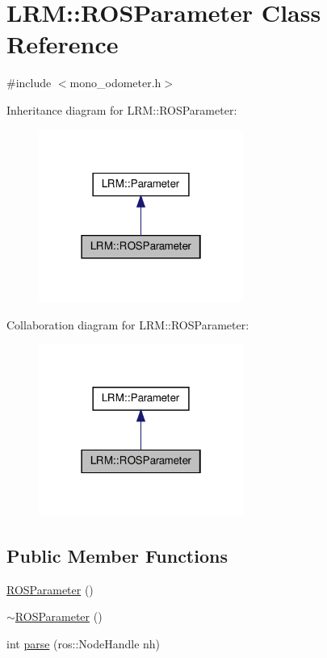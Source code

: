 \hypertarget{classLRM_1_1ROSParameter}{\section{\-L\-R\-M\-:\-:\-R\-O\-S\-Parameter \-Class \-Reference}
\label{classLRM_1_1ROSParameter}
}


{\ttfamily \#include $<$mono\-\_\-odometer.\-h$>$}



\-Inheritance diagram for \-L\-R\-M\-:\-:\-R\-O\-S\-Parameter\-:\nopagebreak
\begin{figure}[H]
\begin{center}
\leavevmode
\includegraphics[width=190pt]{classLRM_1_1ROSParameter__inherit__graph}
\end{center}
\end{figure}


\-Collaboration diagram for \-L\-R\-M\-:\-:\-R\-O\-S\-Parameter\-:\nopagebreak
\begin{figure}[H]
\begin{center}
\leavevmode
\includegraphics[width=190pt]{classLRM_1_1ROSParameter__coll__graph}
\end{center}
\end{figure}
\subsection*{\-Public \-Member \-Functions}
\begin{DoxyCompactItemize}
\item 
\hyperlink{classLRM_1_1ROSParameter_a1829f2f498ed9baa732c5653a29fa18d}{\-R\-O\-S\-Parameter} ()
\item 
\hyperlink{classLRM_1_1ROSParameter_a858dfa2e9ab046a7dba1699cb712f810}{$\sim$\-R\-O\-S\-Parameter} ()
\item 
int \hyperlink{classLRM_1_1ROSParameter_adfd704986bd8a4c12e1139b2a8d08871}{parse} (ros\-::\-Node\-Handle nh)
\end{DoxyCompactItemize}


